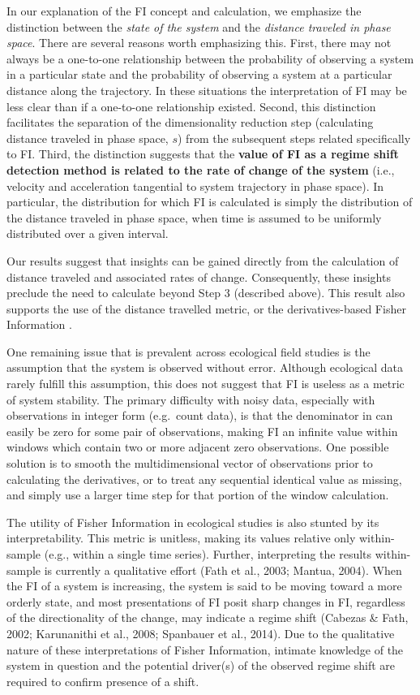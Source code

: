 \documentclass[12pt,twoside,openany]{reedthesis}
\begin{document}
In our explanation of the FI concept and calculation, we emphasize the distinction between the \emph{state of the system} and the \emph{distance traveled in phase space}. There are several reasons worth emphasizing this. First, there may not always be a one-to-one relationship between the probability of observing a system in a particular state and the probability of observing a system at a particular distance along the trajectory. In these situations the interpretation of FI may be less clear than if a one-to-one relationship existed. Second, this distinction facilitates the separation of the dimensionality reduction step (calculating distance traveled in phase space, \(s\)) from the subsequent steps related specifically to FI. Third, the distinction suggests that the \textbf{value of FI as a regime shift detection method is related to the rate of change of the system} (i.e., velocity and acceleration tangential to system trajectory in phase space). In particular, the distribution for which FI is calculated is simply the distribution of the distance traveled in phase space, when time is assumed to be uniformly distributed over a given interval.

Our results suggest that insights can be gained directly from the calculation of distance traveled and associated rates of change. Consequently, these insights preclude the need to calculate beyond Step 3 (described above). This result also supports the use of the distance travelled metric, or the derivatives-based Fisher Information \label{eq:fiDerivs}.

One remaining issue that is prevalent across ecological field studies is the assumption that the system is observed without error. Although ecological data rarely fulfill this assumption, this does not suggest that FI is useless as a metric of system stability. The primary difficulty with noisy data, especially with observations in integer form (e.g.~count data), is that the denominator in can easily be zero for some pair of observations, making FI an infinite value within windows which contain two or more adjacent zero observations. One possible solution is to smooth the multidimensional vector of observations prior to calculating the derivatives, or to treat any sequential identical value as missing, and simply use a larger time step for that portion of the window calculation.

The utility of Fisher Information in ecological studies is also stunted by its interpretability. This metric is unitless, making its values relative only within-sample (e.g., within a single time series). Further, interpreting the results within-sample is currently a qualitative effort (Fath et al., 2003; Mantua, 2004). When the FI of a system is increasing, the system is said to be moving toward a more orderly state, and most presentations of FI posit sharp changes in FI, regardless of the directionality of the change, may indicate a regime shift (Cabezas \& Fath, 2002; Karunanithi et al., 2008; Spanbauer et al., 2014). Due to the qualitative nature of these interpretations of Fisher Information, intimate knowledge of the system in question and the potential driver(s) of the observed regime shift are required to confirm presence of a shift.
\end{document}
